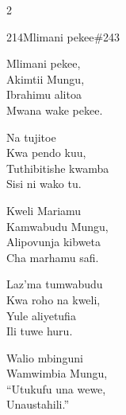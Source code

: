\documentclass{article}
\begin{document}
\begin{multicols}{2}
\begin{hymn}{214}{Mlimani pekee}{\#243}
\begin{stanza}
Mlimani pekee,\\
Akimtii Mungu,\\
Ibrahimu alitoa\\
Mwana wake pekee.
\end{stanza}
\begin{chorus}
Na tujitoe\\
Kwa pendo kuu,\\
Tuthibitishe kwamba\\
Sisi ni wako tu.
\end{chorus}
\begin{stanza}
Kweli Mariamu\\
Kamwabudu Mungu,\\
Alipovunja kibweta\\
Cha marhamu safi.
\end{stanza}
\begin{stanza}
Laz'ma tumwabudu\\
Kwa roho na kweli,\\
Yule aliyetufia\\
Ili tuwe huru.
\end{stanza}
\begin{stanza}
Walio mbinguni\\
Wamwimbia Mungu,\\
``Utukufu una wewe,\\
Unaustahili.''
\end{stanza}
\end{hymn}


\end{multicols}
\end{document}
